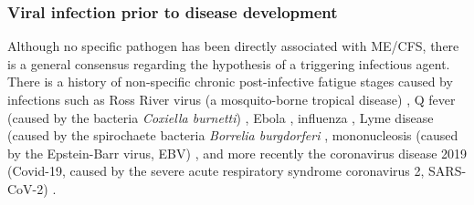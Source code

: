 \subsubsection{Viral infection prior to disease development}

Although no specific pathogen has been directly associated with ME/CFS, there is a general consensus regarding the hypothesis of a triggering infectious agent.
There is a history of non-specific chronic post-infective fatigue stages caused by infections such as Ross River virus (a mosquito-borne tropical disease) \citep{harley2002RossRiver, hickie2006PostinfectiveChronicb}, Q fever (caused by the bacteria \textit{Coxiella burnetti}) \citep{ayres1998PostinfectionFatigue}, Ebola \citep{hickie2006PostinfectiveChronicb, prevailiiistudygroup2019LongitudinalStudy}, influenza \citep{magnus2015ChronicFatigue}, Lyme disease (caused by the spirochaete bacteria \textit{Borrelia burgdorferi} \citep{shadick1994LongtermClinical}, mononucleosis (caused by the Epstein-Barr virus, EBV) \citep{pedersen2019PredictorsChronic}, and more recently the coronavirus disease 2019 (Covid-19, caused by the severe acute respiratory syndrome coronavirus 2, SARS-CoV-2) \citep{havervall2021SymptomsFunctional, choutka2022UnexplainedPostacute}.



